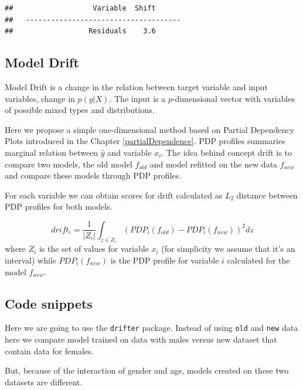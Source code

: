 \documentclass[12pt,]{krantz}
\theoremstyle{definition}
\theoremstyle{definition}
\theoremstyle{definition}
\theoremstyle{remark}
\begin{document}
\begin{verbatim}
##                   Variable  Shift
##   -------------------------------------
##                  Residuals    3.6
\end{verbatim}

\hypertarget{model-drift}{%
\subsection{Model Drift}\label{model-drift}}

Model Drift is a change in the relation between target variable and
input variables, change in \(p(y|X)\). The input is a \(p\)-dimensional
vector with variables of possible mixed types and distributions.

Here we propose a simple one-dimensional method based on Partial
Dependency Plots introduced in the Chapter \ref{partialDependence}. PDP
profiles summaries marginal relation between \(\hat y\) and variable
\(x_i\). The idea behind concept drift is to compare two models, the old
model \(f_{old}\) and model refitted on the new data \(f_{new}\) and
compare these models through PDP profiles.

For each variable we can obtain scores for drift calculated as \(L_2\)
distance between PDP profiles for both models.

\[
drift_{i} = \frac 1 {|Z_i|}\int_{z\in Z_i} (PDP_i(f_{old}) - PDP_i(f_{new}))^2 dz
\] where \(Z_i\) is the set of values for variable \(x_i\) (for
simplicity we assume that it's an interval) while \(PDP_i(f_{new})\) is
the PDP profile for variable \(i\) calculated for the model \(f_{new}\).

\hypertarget{code-snippets-4}{%
\subsection{Code snippets}\label{code-snippets-4}}

Here we are going to use the \texttt{drifter} package. Instead of using
\texttt{old} and \texttt{new} data here we compare model trained on data
with males versus new dataset that contain data for females.

But, because of the interaction of gender and age, models created on
these two datasets are different.
\end{document}
